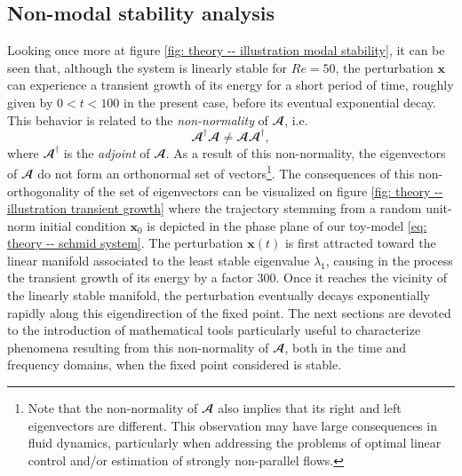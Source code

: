 
  \subsection{Non-modal stability analysis}
  \label{subsec: theory -- non-modal stability}

  Looking once more at figure \ref{fig: theory -- illustration modal stability}, it can be seen that, although the system is linearly stable for $Re=50$, the perturbation $\mathbf{x}$ can experience a transient growth of its energy for a short period of time, roughly given by $0 < t <100$ in the present case, before its eventual exponential decay. This behavior is related to the \emph{non-normality} of $\mathbfcal{A}$, i.e.\
  \begin{equation}
    \mathbfcal{A}^{\dagger} \mathbfcal{A} \neq \mathbfcal{A} \mathbfcal{A}^{\dagger},
    \label{eq: theory -- non-normality equation}
  \end{equation}
  where $\mathbfcal{A}^{\dagger}$ is the \emph{adjoint} of $\mathbfcal{A}$. As a result of this non-normality, the eigenvectors of $\mathbfcal{A}$ do not form an orthonormal set of vectors\footnote{Note that the non-normality of $\mathbfcal{A}$ also implies that its right and left eigenvectors are different. This observation may have large consequences in fluid dynamics, particularly when addressing the problems of optimal linear control and/or estimation of strongly non-parallel flows.}. The consequences of this non-orthogonality of the set of eigenvectors can be visualized on figure \ref{fig: theory -- illustration transient growth} where the trajectory stemming from a random unit-norm initial condition $\mathbf{x}_0$ is depicted in the phase plane of our toy-model \eqref{eq: theory -- schmid system}. The perturbation $\mathbf{x}(t)$ is first attracted toward the linear manifold associated to the least stable eigenvalue $\lambda_1$, causing in the process the transient growth of its energy by a factor 300. Once it reaches the vicinity of the linearly stable manifold, the perturbation eventually decays exponentially rapidly along this eigendirection of the fixed point. The next sections are devoted to the introduction of mathematical tools particularly useful to characterize phenomena resulting from this non-normality of $\mathbfcal{A}$, both in the time and frequency domains, when the fixed point considered is stable.

